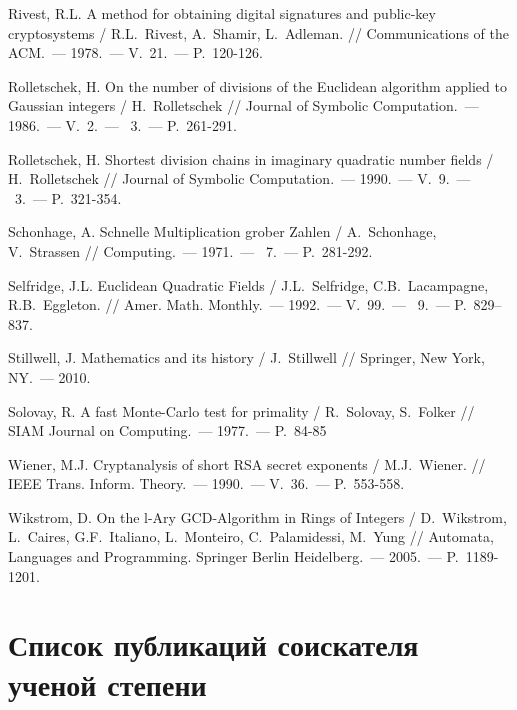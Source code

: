 \begin{thebibliography}{99}
    Rivest, R.L. A method for obtaining digital signatures and public-key cryptosystems / R.L.~Rivest, A.~Shamir, L.~Adleman. // Communications of the ACM.~--- 1978.~--- V.~21.~--- P.~120-126.
    
    Rolletschek, H. On the number of divisions of the Euclidean algorithm applied to Gaussian integers / H.~Rolletschek // Journal of Symbolic Computation.~--- 1986.~--- V.~2.~--- \textnumero~3.~--- P.~261-291.
    
    Rolletschek, H. Shortest division chains in imaginary quadratic number fields / H.~Rolletschek // Journal of Symbolic Computation.~--- 1990.~--- V.~9.~--- \textnumero~3.~--- P.~321-354.

    Schonhage, A. Schnelle Multiplication grober Zahlen / A.~Schonhage, V.~Strassen // Computing.~--- 1971.~--- \textnumero~7.~--- P.~281-292.

    Selfridge, J.L. Euclidean Quadratic Fields / J.L.~Selfridge, C.B.~Lacampagne, R.B.~Eggleton. // Amer. Math. Monthly.~--- 1992.~--- V.~99.~--- \textnumero~9.~--- P.~829--837.

    Stillwell, J. Mathematics and its history / J.~Stillwell // Springer, New York, NY.~--- 2010.

    Solovay, R. A fast Monte-Carlo test for primality / R.~Solovay, S.~Folker // SIAM Journal on Computing.~--- 1977.~--- P.~84-85
    
    Wiener, M.J. Cryptanalysis of short RSA secret exponents / M.J.~Wiener. // IEEE Trans. Inform. Theory.~--- 1990.~--- V.~36.~--- P.~553-558.

    Wikstrom, D. On the l-Ary GCD-Algorithm in Rings of Integers / D.~Wikstrom, L.~Caires, G.F.~Italiano, L.~Monteiro, C.~Palamidessi, M.~Yung // Automata, Languages and Programming. Springer Berlin Heidelberg.~--- 2005.~--- P.~1189-1201.

\end{thebibliography}

\newpage
\section*{Список публикаций соискателя ученой степени}

\renewcommand{\labelenumi}{\arabic{enumi}--A}
\renewcommand{\theenumi}{\arabic{enumi}--A}

